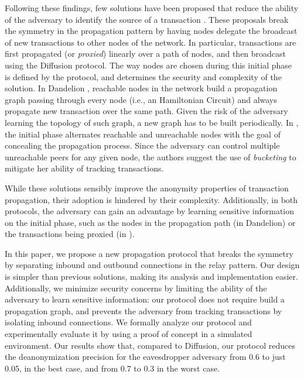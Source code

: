 \documentclass{article}
\begin{document}
	Following these findings, few solutions have been proposed that reduce the ability of the adversary to identify the source of a transaction \cite{venkatakrishnan2017dandelion,franzoni2020improving}.
	These proposals break the symmetry in the propagation pattern by having nodes delegate the broadcast of new transactions to other nodes of the network.
	In particular, transactions are first propagated (or \textit{proxied}) linearly over a path of nodes, and then broadcast using the Diffusion protocol.
	The way nodes are chosen during this initial phase is defined by the protocol, and determines the security and complexity of the solution.
	In Dandelion \cite{venkatakrishnan2017dandelion}, reachable nodes in the network build a propagation graph passing through every node (i.e., an Hamiltonian Circuit) and always propagate new transaction over the same path. Given the risk of the adversary learning the topology of such graph, a new graph has to be built periodically.
	In \cite{franzoni2020improving}, the initial phase alternates reachable and unreachable nodes with the goal of concealing the propagation process. Since the adversary can control multiple unreachable peers for any given node, the authors suggest the use of \textit{bucketing} \cite{bucketing} to mitigate her ability of tracking transactions.
	
	While these solutions sensibly improve the anonymity properties of transaction propagation, their adoption is hindered by their complexity.
	Additionally, in both protocols, the adversary can gain an advantage by learning sensitive information on the initial phase, such as the nodes in the propagation path (in Dandelion) or the transactions being proxied (in \cite{franzoni2020improving}).
	
	In this paper, we propose a new propagation protocol that breaks the symmetry by separating inbound and outbound connections in the relay pattern.
	Our design is simpler than previous solutions, making its analysis and implementation easier.
	Additionally, we minimize security concerns by limiting the ability of the adversary to learn sensitive information: our protocol does not require build a propagation graph, and prevents the adversary from tracking transactions by isolating inbound connections.
	We formally analyze our protocol and experimentally evaluate it by using a proof of concept in a simulated environment.
	Our results show that, compared to Diffusion, our protocol reduces the deanonymization precision for the eavesdropper adversary from 0.6 to just 0.05, in the best case, and from 0.7 to 0.3 in the worst case.
	
\end{document}
